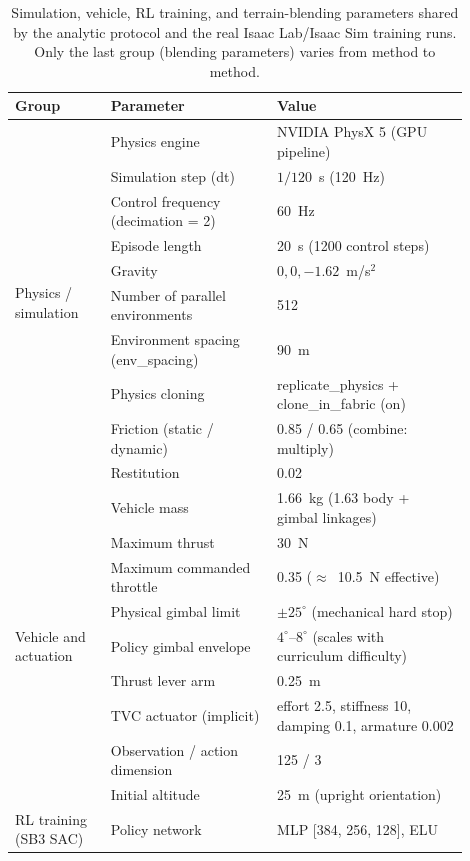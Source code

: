 \begin{table}[t]
\centering
\caption{Simulation, vehicle, RL training, and terrain-blending
parameters shared by the analytic protocol and the real Isaac
Lab/Isaac Sim training runs. Only the last group (blending parameters)
varies from method to method.}
\label{tab:config}
\footnotesize
\begin{tabular}{@{}p{0.19\linewidth}p{0.33\linewidth}p{0.38\linewidth}@{}}
\toprule
\textbf{Group} & \textbf{Parameter} & \textbf{Value} \\
\midrule
\multirow{10}{*}{Physics / simulation}
 & Physics engine & NVIDIA PhysX 5 (GPU pipeline) \\
 & Simulation step (dt) & $1/120$~s (\SI{120}{\hertz}) \\
 & Control frequency (decimation = 2) & \SI{60}{\hertz} \\
 & Episode length & \SI{20}{\second} (1200 control steps) \\
 & Gravity & $0,0,-1.62$~m/s$^2$ \\
 & Number of parallel environments & 512 \\
 & Environment spacing (env\_spacing) & \SI{90}{\meter} \\
 & Physics cloning & replicate\_physics + clone\_in\_fabric (on) \\
 & Friction (static / dynamic) & 0.85 / 0.65 (combine: multiply) \\
 & Restitution & 0.02 \\
\midrule
\multirow{9}{*}{Vehicle and actuation}
 & Vehicle mass & 1.66~kg (1.63 body + gimbal linkages) \\
 & Maximum thrust & 30~N \\
 & Maximum commanded throttle & 0.35 ($\approx$~10.5~N effective) \\
 & Physical gimbal limit & $\pm25^\circ$ (mechanical hard stop) \\
 & Policy gimbal envelope & $4^\circ$--$8^\circ$ (scales with curriculum difficulty) \\
 & Thrust lever arm & 0.25~m \\
 & TVC actuator (implicit) & effort 2.5, stiffness 10, damping 0.1, armature 0.002 \\
 & Observation / action dimension & 125 / 3 \\
 & Initial altitude & 25~m (upright orientation) \\
\midrule
\multirow{12}{*}{RL training (SB3 SAC)}
 & Policy network & MLP [384, 256, 128], ELU \\

\end{tabular}
\end{table}
